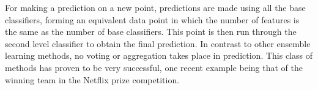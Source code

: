 For making a prediction on a new point, predictions are made using all the base classifiers, forming an equivalent data point in which the number of features is the same as the number of base classifiers. This point is then run through the second level classifier to obtain the final prediction. In contrast to other ensemble learning methods, no voting or aggregation takes place in prediction. This class of methods has proven to be very successful, one recent example being that of the winning team in the Netflix prize competition.
